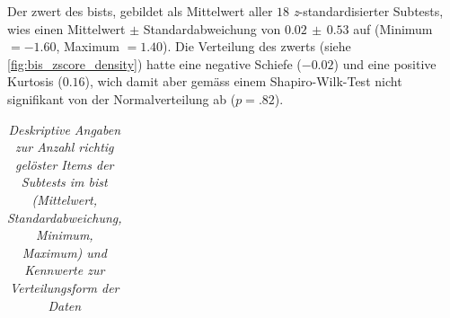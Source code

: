 \documentclass[11pt, twoside, a4paper]{book}		%
\begin{document}
Der \gls{zwert} des \gls{bist}s, gebildet als Mittelwert aller $18$ \textit{z}-stand\-ard\-isier\-ter Subtests, wies einen Mittelwert $\pm$ Standardabweichung von $0.02\,\pm\,0.53$ auf (Minimum $= -1.60$, Maximum $= 1.40$). Die Verteilung des \gls{zwert}s (siehe \autoref{fig:bis_zscore_density}) hatte eine negative Schiefe ($-0.02$) und eine positive Kurtosis ($0.16$), wich damit aber gemäss einem Shapiro-Wilk-Test  nicht signifikant von der Normalverteilung ab ($p=.82$).

\begin{table}[!t]
	\centering
	\captionsetup{labelsep = none}
	\caption[Deskriptive Angaben zur Anzahl richtig gelöster Items der Subtests im \gls{bist}]{\newline  \textit{Deskriptive Angaben zur Anzahl richtig gelöster Items der Subtests im \gls{bist} (Mittelwert, Standardabweichung, Minimum, Maximum) und Kennwerte zur Verteilungsform der Daten} \vspace{.2cm}}
	\label{tab:bis_descriptives}
	\begin{adjustbox}{width=.82\textwidth,keepaspectratio} %
	\begin{threeparttable}
		\begin{tabular}{
				l
				S[table-format = 2.2]
				S[table-format = 2.2]
				S[table-format = 1.0]
				S[table-format = 2.0]
				S[table-format = 1.2]
				S[table-format = 1.2]
				S[table-format = < 0.3, add-integer-zero=false]
				}
			\hline


\end{tabular}
\end{threeparttable}
\end{adjustbox}
\end{table}
\end{document}
